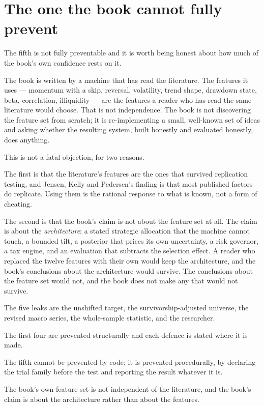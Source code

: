 \section{The one the book cannot fully prevent}

The fifth is not fully preventable and it is worth being honest about how
much of the book's own confidence rests on it.

The book is written by a machine that has read the literature. The
features it uses --- momentum with a skip, reversal, volatility, trend
shape, drawdown state, beta, correlation, illiquidity --- are the
features a reader who has read the same literature would choose. That is
not independence. The book is not discovering the feature set from
scratch; it is re-implementing a small, well-known set of ideas and asking
whether the resulting system, built honestly and evaluated honestly, does
anything.

This is not a fatal objection, for two reasons.

The first is that the literature's features are the ones that survived
replication testing, and Jensen, Kelly and Pedersen's finding is that most
published factors do replicate. Using them is the rational response to
what is known, not a form of cheating.

The second is that the book's claim is not about the feature set at all.
The claim is about the \emph{architecture}: a stated strategic allocation
that the machine cannot touch, a bounded tilt, a posterior that prices its
own uncertainty, a risk governor, a tax engine, and an evaluation that
subtracts the selection effect. A reader who replaced the twelve features
with their own would keep the architecture, and the book's conclusions
about the architecture would survive. The conclusions about the feature
set would not, and the book does not make any that would not survive.

\begin{keytakeaways}
\item The five leaks are the unshifted target, the survivorship-adjusted
universe, the revised macro series, the whole-sample statistic, and the
researcher.
\item The first four are prevented structurally and each defence is stated
where it is made.
\item The fifth cannot be prevented by code; it is prevented procedurally,
by declaring the trial family before the test and reporting the result
whatever it is.
\item The book's own feature set is not independent of the literature, and
the book's claim is about the architecture rather than about the
features.
\end{keytakeaways}
